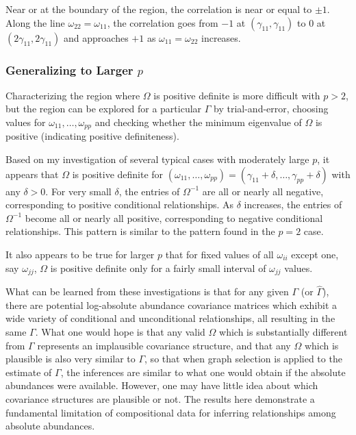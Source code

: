\documentclass[12pt]{article}
\begin{document}
Near or at the boundary of the region, the correlation is near or equal to $\pm 1$. Along the line $\omega_{22} = \omega_{11}$, the correlation goes from $-1$ at $(\gamma_{11}, \gamma_{11})$ to 0 at $(2\gamma_{11}, 2\gamma_{11})$ and approaches $+1$ as $\omega_{11} = \omega_{22}$ increases.

\subsubsection*{Generalizing to Larger $p$}

Characterizing the region where $\Omega$ is positive definite is more difficult with $p > 2$, but the region can be explored for a particular $\Gamma$ by trial-and-error, choosing values for $\omega_{11}, \dots, \omega_{pp}$ and checking whether the minimum eigenvalue of $\Omega$ is positive (indicating positive definiteness).

Based on my investigation of several typical cases with moderately large $p$, it appears that $\Omega$ is positive definite for $(\omega_{11}, \dots, \omega_{pp}) = (\gamma_{11} + \delta, \dots, \gamma_{pp} + \delta)$ with any $\delta > 0$. For very small $\delta$, the entries of $\Omega^{-1}$ are all or nearly all negative, corresponding to positive conditional relationships. As $\delta$ increases, the entries of $\Omega^{-1}$ become all or nearly all positive, corresponding to negative conditional relationships. This pattern is similar to the pattern found in the $p = 2$ case.

It also appears to be true for larger $p$ that for fixed values of all $\omega_{ii}$ except one, say $\omega_{jj}$, $\Omega$ is positive definite only for a fairly small interval of $\omega_{jj}$ values.

What can be learned from these investigations is that for any given $\Gamma$ (or $\hat{\Gamma}$), there are potential log-absolute abundance covariance matrices which exhibit a wide variety of conditional and unconditional relationships, all resulting in the same $\Gamma$. What one would hope is that any valid $\Omega$ which is substantially different from $\Gamma$ represents an implausible covariance structure, and that any $\Omega$ which is plausible is also very similar to $\Gamma$, so that when graph selection is applied to the estimate of $\Gamma$, the inferences are similar to what one would obtain if the absolute abundances were available. However, one may have little idea about which covariance structures are plausible or not. The results here demonstrate a fundamental limitation of compositional data for inferring relationships among absolute abundances.
\end{document}
